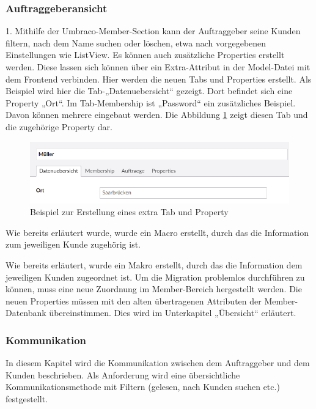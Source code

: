 \subsubsection{Auftraggeberansicht}
  
1.	Mithilfe der Umbraco-Member-Section kann der Auftraggeber seine Kunden filtern, nach dem Name suchen oder löschen, etwa nach vorgegebenen Einstellungen wie ListView\cite{UmbracoTV2018ListView}. Es können auch zusätzliche Properties erstellt werden. Diese lassen sich können über ein Extra-Attribut in der Model-Datei mit dem Frontend verbinden. Hier werden die neuen Tabs und Properties erstellt. Als Beispiel wird hier die Tab-„Datenuebersicht“ gezeigt. Dort befindet sich eine Property „Ort“. Im Tab-Membership ist „Password“ ein zusätzliches Beispiel. Davon können mehrere eingebaut werden. Die Abbildung \ref{fig:auftraggeberAnsichtDaten} zeigt diesen Tab und die zugehörige Property dar.  

\begin{figure}[h]
	\centering
	\includegraphics[width=1\linewidth]{Graphics/auftraggeberAnsichtDaten.png}
	\caption[Kundeansicht]{Beispiel zur Erstellung eines extra Tab und Property}
	\label{fig:auftraggeberAnsichtDaten}
\end{figure}
 Wie bereits erläutert wurde, wurde ein Macro erstellt, durch das die Information zum jeweiligen Kunde zugehörig ist. 

Wie bereits erläutert, wurde ein Makro erstellt, durch das die Information dem jeweiligen Kunden zugeordnet ist.
Um die Migration problemlos durchführen zu können, muss eine neue Zuordnung im Member-Bereich hergestellt werden. Die neuen Properties müssen mit den alten übertragenen Attributen der Member-Datenbank übereinstimmen. Dies wird im Unterkapitel „Übersicht“ erläutert.

\subsubsection{Kommunikation}

In diesem Kapitel wird die Kommunikation zwischen dem Auftraggeber und dem Kunden beschrieben. Als Anforderung wird eine übersichtliche Kommunikationsmethode mit Filtern (gelesen, nach Kunden suchen etc.) festgestellt.

